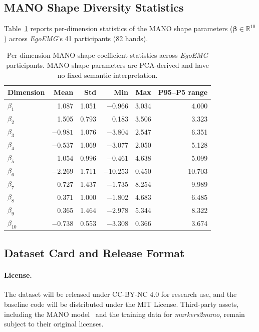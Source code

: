 \documentclass{article}
\newcommand{\dataset}{\textit{EgoEMG}}
\newcommand{\marker}{\textit{markers2mano}}
\begin{document}
\subsection{MANO Shape Diversity Statistics}
\label{app:beta_stats}

Table~\ref{tab:beta_stats} reports per-dimension statistics of the MANO shape parameters ($\boldsymbol{\beta} \in \mathbb{R}^{10}$) across \dataset{}'s 41 participants (82 hands).

\begin{table}[h]
\centering
\caption{Per-dimension MANO shape coefficient statistics across \dataset{} participants. MANO shape parameters are PCA-derived and have no fixed semantic interpretation.}
\label{tab:beta_stats}
\begin{tabular}{lrrrrr}
\toprule
Dimension & Mean & Std & Min & Max & P95--P5 range \\
\midrule
$\beta_1$ & 1.087 & 1.051 & $-0.966$ & 3.034 & 4.000 \\
$\beta_2$ & 1.505 & 0.793 & 0.183 & 3.506 & 3.323 \\
$\beta_3$ & $-0.981$ & 1.076 & $-3.804$ & 2.547 & 6.351 \\
$\beta_4$ & $-0.537$ & 1.069 & $-3.077$ & 2.050 & 5.128 \\
$\beta_5$ & 1.054 & 0.996 & $-0.461$ & 4.638 & 5.099 \\
$\beta_6$ & $-2.269$ & 1.711 & $-10.253$ & 0.450 & 10.703 \\
$\beta_7$ & 0.727 & 1.437 & $-1.735$ & 8.254 & 9.989 \\
$\beta_8$ & 0.371 & 1.000 & $-1.802$ & 4.683 & 6.485 \\
$\beta_9$ & 0.365 & 1.464 & $-2.978$ & 5.344 & 8.322 \\
$\beta_{10}$ & $-0.738$ & 0.553 & $-3.308$ & 0.366 & 3.674 \\
\bottomrule
\end{tabular}
\end{table}

\subsection{Dataset Card and Release Format}
\label{app:dataset_card}

\paragraph{License.}
The dataset will be released under CC-BY-NC 4.0 for research use, and the baseline code will be distributed under the MIT License. Third-party assets, including the MANO model~\citep{mano} and the training data for \marker{}, remain subject to their original licenses.
\end{document}
